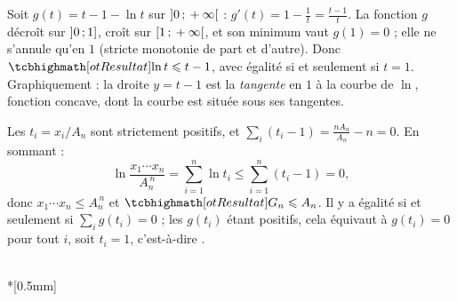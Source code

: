 \begin{corrigeEval}{}{}
\begin{questions}[start=5]
  \item Soit $g(t)=t-1-\ln t$ sur $\mathopen{]}0\,{;}\,+\infty\mathclose{[}$ :
    $g'(t)=1-\frac1t=\frac{t-1}{t}$. La fonction $g$ décroît sur
    $\mathopen{]}0\,{;}\,1\mathclose{]}$, croît sur $\mathopen{[}1\,{;}\,+\infty\mathclose{[}$, et son minimum vaut $g(1)=0$ ;
    elle ne s'annule qu'en $1$ (stricte monotonie de part et d'autre). Donc
    $\res{\ln t\leqslant t-1}$, avec égalité si et seulement si $t=1$.
    Graphiquement : la droite $y=t-1$ est la \emph{tangente} en $1$ à la
    courbe de $\ln$, fonction concave, dont la courbe est située sous ses
    tangentes.
  \item Les $t_i=x_i/A_n$ sont strictement positifs, et
    $\sum_i(t_i-1)=\frac{nA_n}{A_n}-n=0$. En sommant :
    \[\ln\frac{x_1\cdots x_n}{A_n^{\,n}}=\sum_{i=1}^{n}\ln t_i\leqslant\sum_{i=1}^{n}(t_i-1)=0,\]
    donc $x_1\cdots x_n\leqslant A_n^{\,n}$ et $\res{G_n\leqslant A_n}$. Il y a
    égalité si et seulement si $\sum_i g(t_i)=0$ ; les $g(t_i)$ étant positifs,
    cela équivaut à $g(t_i)=0$ pour tout $i$, soit $t_i=1$, c'est-à-dire
    .
\end{questions}
\begin{center}\begin{minipage}{\linewidth}\centering
{}\\*[0.5mm]
\end{minipage}\end{center}
\end{corrigeEval}

